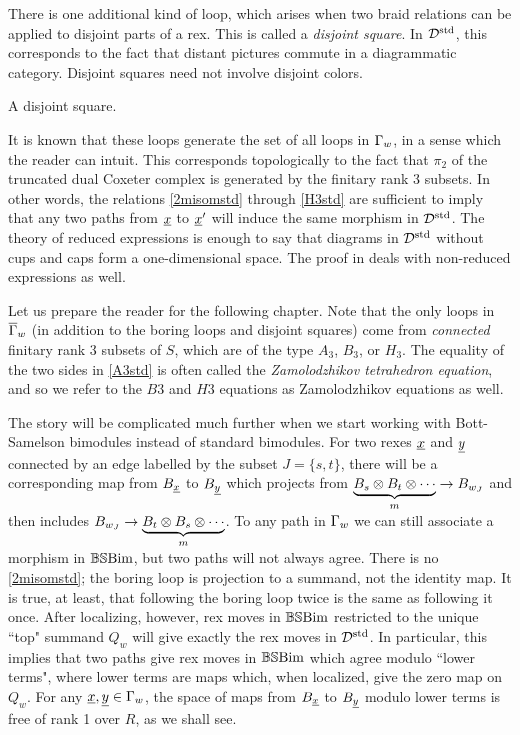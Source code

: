 There is one additional kind of loop, which arises when two braid relations can be applied to disjoint parts of a rex. This is called a \emph{disjoint square}. In ${\mathcal{D}}^{\textrm{std}}$, this corresponds
to the fact that distant pictures commute in a diagrammatic category. Disjoint squares need not involve disjoint colors.

\begin{ex} A disjoint square.   \end{ex}

It is known \cite[Chapter 2, \S 5]{Ronan} that these loops generate the set of all loops in $\Gamma_w$, in a sense which the reader can intuit. This corresponds topologically to the fact that
$\pi_2$ of the truncated dual Coxeter complex is generated by the finitary rank 3 subsets. In other words, the relations \eqref{2misomstd} through \eqref{H3std} are sufficient to imply
that any two paths from $\underline{x}$ to $\underline{x}'$ will induce the same morphism in ${\mathcal{D}}^{\textrm{std}}$. The theory of reduced expressions is enough to say that diagrams in ${\mathcal{D}}^{\textrm{std}}$ without cups and caps form a one-dimensional space. The proof in \cite{EWFenn} deals with non-reduced expressions as well.

Let us prepare the reader for the following chapter. Note that the only loops in $\overline{\Gamma}_w$ (in addition to the boring loops and disjoint squares) come from \emph{connected} finitary rank 3
subsets of $S$, which are of the type $A_3$, $B_3$, or $H_3$. The equality of the two sides in \eqref{A3std} is often called the \emph{Zamolodzhikov tetrahedron equation}, and so we refer to the
$B3$ and $H3$ equations as Zamolodzhikov equations as well.

The story will be complicated much further when we start working with Bott-Samelson bimodules instead of standard bimodules. For two rexes ${\underline{x}}$ and ${\underline{y}}$ connected by an edge
labelled by the subset $J=\{s,t\}$, there will be a corresponding map from $B_{\underline{x}}$ to $B_{\underline{y}}$ which projects from $\underbrace{B_s \otimes B_t \otimes \cdots}_{m} \rightarrow B_{w_J}$ and then includes
$B_{w_J} \rightarrow \underbrace{B_t \otimes B_s \otimes \cdots}_{m}$. To any path in $\Gamma_w$ we can still associate a morphism in $\mathbb{BS}\textrm{Bim}$, but two paths will not always agree. There is no \eqref{2misomstd}; the
boring loop is projection to a summand, not the identity map. It is true, at least, that following the boring loop twice is the same as following it once. After localizing, however, rex
moves in $\mathbb{BS}\textrm{Bim}$ restricted to the unique ``top" summand $Q_w$ will give exactly the rex moves in ${\mathcal{D}}^{\textrm{std}}$. In particular, this implies that two paths give rex moves in $\mathbb{BS}\textrm{Bim}$ which
agree modulo ``lower terms", where lower terms are maps which, when localized, give the zero map on $Q_w$. For any ${\underline{x}},{\underline{y}} \in \Gamma_w$, the space of maps from $B_{\underline{x}}$ to
$B_{\underline{y}}$ modulo lower terms is free of rank 1 over $R$, as we shall see.

